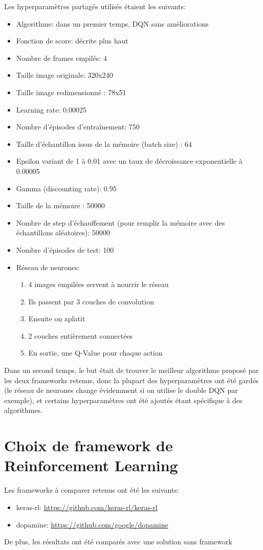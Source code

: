 \documentclass[a4paper,10pt,openany,oneside]{report}
\newcommand{\link}[1]{{\color{blue}\href{#1}{#1}}}
\begin{document}
Les hyperparamètres partagés utilisés étaient les suivants:
\begin{itemize}
\item Algorithme: dans un premier temps, DQN sans améliorations
\item Fonction de score: décrite plus haut
\item Nombre de frames empilés: 4
\item Taille image originale: 320x240
\item Taille image redimensionné : 78x51
\item Learning rate: 0.00025
\item Nombre d'épisodes d'entraînement: 750
\item Taille d'échantillon issus de la mémoire (batch size) : 64
\item Epsilon variant de 1 à 0.01 avec un taux de décroissance exponentielle à 0.00005
\item Gamma (discounting rate): 0.95
\item Taille de la mémoire : 50000
\item Nombre de step d'échauffement (pour remplir la mémoire avec des échantillons aléatoires): 50000
\item Nombre d'épisodes de test: 100 
\item Réseau de neurones: 
\begin{enumerate}
	\item 4 images empilées servent à nourrir le réseau
	\item Ils passent par 3 couches de convolution
	\item Ensuite on aplatit
	\item 2 couches entièrement connectées
	\item En sortie, une Q-Value pour chaque action
\end{enumerate}
\end{itemize}

Dans un second temps, le but était de trouver le meilleur algorithme proposé par les deux frameworks retenus, donc la plupart des hyperparamètres ont été gardés (le réseau de neurones change évidemment si on utilise le double DQN par exemple), et certains hyperparamètres ont été ajoutés étant spécifique à des algorithmes.
\section{Choix de framework de Reinforcement Learning}
Les frameworks à comparer retenus ont été les suivants:
\begin{itemize}
	\item keras-rl: \link{https://github.com/keras-rl/keras-rl}
	\item dopamine: \link{https://github.com/google/dopamine}
\end{itemize}
De plus, les résultats ont été comparés avec une solution sans framework \cite[]{sansFramework}
\end{document}
